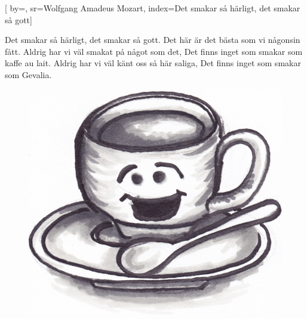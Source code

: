 

[ 		%
	by={},					%
	sr={Wolfgang Amadeus Mozart},					%
	index={Det smakar så härligt, det smakar så gott}]						%
	
\beginverse*						%
Det smakar så härligt, det smakar så gott.
Det här är det bästa som vi någonsin fått. 
Aldrig har vi väl smakat på något som det,
Det finns inget som smakar som kaffe au lait.
Aldrig har vi väl känt oss så här saliga,
Det finns inget som smakar som Gevalia.
\endverse							%

\endsong							%

\begin{figure}[!b]
 \begin{center}
\includegraphics[scale=0.5]{../bilder/gladkaffekopp.jpg} 
\end{center}
\end{figure}